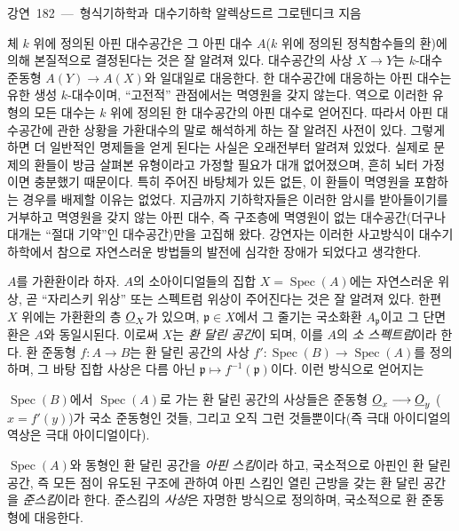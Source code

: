 \unit{강연 182 — 형식기하학과 대수기하학}
%
  {알렉상드르 그로텐디크 지음}


체 $k$ 위에 정의된 아핀 대수공간은 그 아핀 대수 $A$($k$ 위에 정의된
정칙함수들의 환)에 의해 본질적으로 결정된다는 것은 잘 알려져 있다.
대수공간의 사상 $X\longrightarrow Y$는 $k$-대수 준동형
$A(Y)\longrightarrow A(X)$와 일대일로 대응한다. 한 대수공간에 대응하는
아핀 대수는 유한 생성 $k$-대수이며, ``고전적'' 관점에서는 멱영원을 갖지
않는다. 역으로 이러한 유형의 모든 대수는 $k$ 위에 정의된 한 대수공간의
아핀 대수로 얻어진다. 따라서 아핀 대수공간에 관한 상황을 가환대수의
말로 해석하게 하는 잘 알려진 사전이 있다. 그렇게 하면 더 일반적인
명제들을 얻게 된다는 사실은 오래전부터 알려져 있었다. 실제로 문제의
환들이 방금 살펴본 유형이라고 가정할 필요가 대개 없어졌으며, 흔히 뇌터
가정이면 충분했기 때문이다. 특히 주어진 바탕체가 있든 없든, 이 환들이
멱영원을 포함하는 경우를 배제할 이유는 없었다. 지금까지 기하학자들은
이러한 암시를 받아들이기를 거부하고 멱영원을 갖지 않는 아핀 대수, 즉
구조층에 멱영원이 없는 대수공간(더구나 대개는 ``절대 기약''인
대수공간)만을 고집해 왔다. 강연자는 이러한 사고방식이 대수기하학에서
참으로 자연스러운 방법들의 발전에 심각한 장애가 되었다고 생각한다.

$A$를 가환환이라 하자. $A$의 소아이디얼들의 집합
$X=\operatorname{Spec}(A)$에는 자연스러운 위상, 곧 ``자리스키 위상''
또는 스펙트럼 위상이 주어진다는 것은 잘 알려져 있다. 한편 $X$ 위에는
가환환의 층 $\underline{O}_X$가 있으며, $\mathfrak p\in X$에서 그 줄기는
국소화환 $A_{\mathfrak p}$이고 그 단면환은 $A$와 동일시된다. 이로써
$X$는 \emph{환 달린 공간}이 되며, 이를 $A$의 \emph{소 스펙트럼}이라
한다. 환 준동형 $f:A\longrightarrow B$는 환 달린 공간의 사상
$f':\operatorname{Spec}(B)\longrightarrow\operatorname{Spec}(A)$를
정의하며, 그 바탕 집합 사상은 다름 아닌
$\mathfrak p\longmapsto f^{-1}(\mathfrak p)$이다. 이런 방식으로 얻어지는

$\operatorname{Spec}(B)$에서 $\operatorname{Spec}(A)$로 가는 환 달린
공간의 사상들은 준동형 $\underline{O}_x\longrightarrow\underline{O}_y$ ($x=f'(y)$)가
국소 준동형인 것들, 그리고 오직 그런 것들뿐이다(즉 극대 아이디얼의
역상은 극대 아이디얼이다).

$\operatorname{Spec}(A)$와 동형인 환 달린 공간을 \emph{아핀 스킴}이라 하고,
국소적으로 아핀인 환 달린 공간, 즉 모든 점이 유도된 구조에 관하여 아핀
스킴인 열린 근방을 갖는 환 달린 공간을 \emph{준스킴}이라 한다. 준스킴의
\emph{사상}은 자명한 방식으로 정의하며, 국소적으로 환 준동형에 대응한다.

